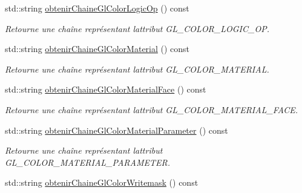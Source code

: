 \begin{DoxyCompactItemize}
std\+::string \hyperlink{group__utilitaire_gac48e5f8e10bfcd96670a537164a0a8ff}{obtenir\+Chaine\+Gl\+Color\+Logic\+Op} () const 
\begin{DoxyCompactList}\small\item\em Retourne une chaîne représentant l\textquotesingle{}attribut G\+L\+\_\+\+C\+O\+L\+O\+R\+\_\+\+L\+O\+G\+I\+C\+\_\+\+O\+P. \end{DoxyCompactList}\item 
std\+::string \hyperlink{group__utilitaire_gae53c823bf9d4e4305baf00f4d7da96af}{obtenir\+Chaine\+Gl\+Color\+Material} () const 
\begin{DoxyCompactList}\small\item\em Retourne une chaîne représentant l\textquotesingle{}attribut G\+L\+\_\+\+C\+O\+L\+O\+R\+\_\+\+M\+A\+T\+E\+R\+I\+A\+L. \end{DoxyCompactList}\item 
std\+::string \hyperlink{group__utilitaire_gaec66f0ae860a11d50b0e1cf2def483bf}{obtenir\+Chaine\+Gl\+Color\+Material\+Face} () const 
\begin{DoxyCompactList}\small\item\em Retourne une chaîne représentant l\textquotesingle{}attribut G\+L\+\_\+\+C\+O\+L\+O\+R\+\_\+\+M\+A\+T\+E\+R\+I\+A\+L\+\_\+\+F\+A\+C\+E. \end{DoxyCompactList}\item 
std\+::string \hyperlink{group__utilitaire_gad2b7f4282f94a24c4b5129854732c36a}{obtenir\+Chaine\+Gl\+Color\+Material\+Parameter} () const 
\begin{DoxyCompactList}\small\item\em Retourne une chaîne représentant l\textquotesingle{}attribut G\+L\+\_\+\+C\+O\+L\+O\+R\+\_\+\+M\+A\+T\+E\+R\+I\+A\+L\+\_\+\+P\+A\+R\+A\+M\+E\+T\+E\+R. \end{DoxyCompactList}\item 
\hypertarget{group__utilitaire_ga677eb5add1db0999f73a7c6febefe4d8}{}std\+::string \hyperlink{group__utilitaire_ga677eb5add1db0999f73a7c6febefe4d8}{obtenir\+Chaine\+Gl\+Color\+Writemask} () const \label{group__utilitaire_ga677eb5add1db0999f73a7c6febefe4d8}


\end{DoxyCompactItemize}

